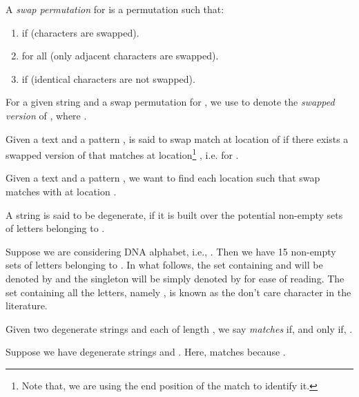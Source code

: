 \documentclass{llncs}
\begin{document}
\begin{definition}
A \emph{swap permutation} for  is a permutation
 such that:
\begin{enumerate}
\item if  (characters are swapped).
\item for all  (only adjacent characters are swapped).
\item if  (identical characters are not
swapped).
\end{enumerate}
\end{definition}

For a given string  and a swap permutation  for , we use
 to denote the \emph{swapped version} of , where
.

\begin{definition}
Given a text  and a pattern ,  is said to swap match at location  of 
if there exists a swapped version  of  that matches  at
location\footnote{Note that, we are using the end position of the
match to identify it.} , i.e.  for
.
\end{definition}



\begin{swap}
Given a text  and a pattern , we want to find each location  such that
 swap matches with  at location .
\end{swap}

\begin{definition}\label{Def_Degenerate_String}
A string  is said to be degenerate, if it is built over the
potential  non-empty sets of letters belonging to
.
\end{definition}


\begin{example}
Suppose we are considering DNA alphabet, i.e., . Then we have 15 non-empty sets of letters belonging to . In what follows, the set containing  and  will be denoted by  and the singleton  will be simply denoted by  for ease of reading. The set containing all the letters, namely , is known as the don't care character in the literature.
\end{example}



\begin{definition}\label{Def_Degenerate_Match}
Given two degenerate strings  and  each of length , we say
 \emph{matches}  if, and only if, .
\end{definition}



\begin{example}\label{Ex_Deg_Match}
Suppose we have degenerate strings  and . Here,  matches  because . 
\end{example}
\end{document}
